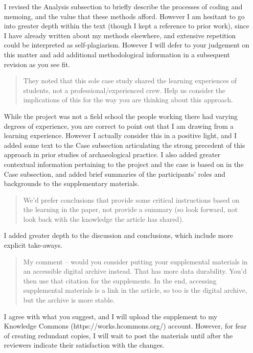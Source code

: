 \documentclass[
]{article}
\begin{document}
I revised the Analysis subsection to briefly describe the processes of
coding and memoing, and the value that these methods afford. However I
am hesitant to go into greater depth within the text (though I kept a
reference to prior work), since I have already written about my methods
elsewhere, and extensive repetition could be interpreted as
self-plagiarism. However I will defer to your judgement on this matter
and add additional methodological information in a subsequent revision
as you see fit.

\begin{quote}
They noted that this sole case study shared the learning experiences of
students, not a professional/experienced crew. Help us consider the
implications of this for the way you are thinking about this approach.
\end{quote}

While the project was not a field school the people working there had
varying degrees of experience, you are correct to point out that I am
drawing from a learning experience. However I actually consider this in
a positive light, and I added some text to the Case subsection
articulating the strong precedent of this approach in prior studies of
archaeological practice. I also added greater contextual information
pertaining to the project and the case is based on in the Case
subsection, and added brief summaries of the participants' roles and
backgrounds to the supplementary materials.

\begin{quote}
We'd prefer conclusions that provide some critical instructions based on
the learning in the paper, not provide a summary (so look forward, not
look back with the knowledge the article has shared).
\end{quote}

I added greater depth to the discussion and conclusions, which include
more explicit take-aways.

\begin{quote}
My comment -- would you consider putting your supplemental materials in
an accessible digital archive instead. That has more data durability.
You'd then use that citation for the supplements. In the end, accessing
supplemental materials is a link in the article, so too is the digital
archive, but the archive is more stable.
\end{quote}

I agree with what you suggest, and I will upload the supplement to my
Knowledge Commons (https://works.hcommons.org/) account. However, for
fear of creating redundant copies, I will wait to post the materials
until after the reviewers indicate their satisfaction with the changes.
\end{document}
